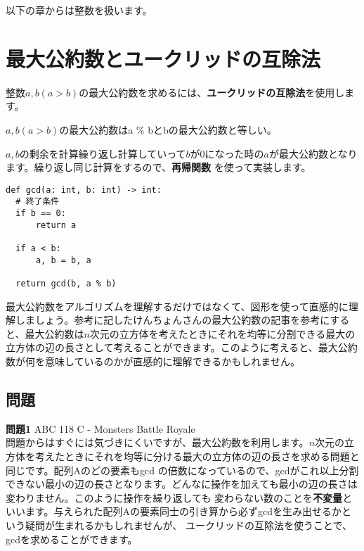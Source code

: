 \documentclass{jlreq}
\begin{document}
 
以下の章からは整数を扱います。

\section{最大公約数とユークリッドの互除法}

整数$a, b(a > b)$の最大公約数を求めるには、\textbf{ユークリッドの互除法}を使用します。

\begin{tcolorbox}[enhanced,title=ユークリッドの互除法, 
  attach boxed title to top left, 
  colback=white!95!blue,
  colbacktitle=white!10!blue!50!black,
  drop fuzzy shadow,
  boxrule=0.25mm,
  ]
  $a, b(a > b)$の最大公約数はa \% bとbの最大公約数と等しい。
\end{tcolorbox}

$a, b$の剰余を計算繰り返し計算していって$b$が0になった時の$a$が最大公約数となります。繰り返し同じ計算をするので、\textbf{再帰関数}
を使って実装します。

\begin{lstlisting}[caption=ユークリッドの互助法実装, frame=TRBL, label={euclid}]
def gcd(a: int, b: int) -> int:
  # 終了条件
  if b == 0:
      return a
  
  if a < b:
      a, b = b, a
      
  return gcd(b, a % b)
\end{lstlisting}

最大公約数をアルゴリズムを理解するだけではなくて、図形を使って直感的に理解しましょう。参考に記したけんちょんさんの最大公約数の記事を参考にすると、最大公約数は$n$次元の立方体を考えたときにそれを均等に分割できる最大の立方体の辺の長さとして考えることができます。このように考えると、最大公約数が何を意味しているのかが直感的に理解できるかもしれません。

\subsection{問題}
\textbf{問題1} ABC 118 C - Monsters Battle Royale \\
問題からはすぐには気づきにくいですが、最大公約数を利用します。$n$次元の立方体を考えたときにそれを均等に分ける最大の立方体の辺の長さを求める問題と同じです。配列Aのどの要素もgcd
の倍数になっているので、gcdがこれ以上分割できない最小の辺の長さとなります。どんなに操作を加えても最小の辺の長さは変わりません。このように操作を繰り返しても
変わらない数のことを\textbf{不変量}といいます。与えられた配列Aの要素同士の引き算から必ずgcdを生み出せるかという疑問が生まれるかもしれませんが、
ユークリッドの互除法を使うことで、gcdを求めることができます。
\end{document}
